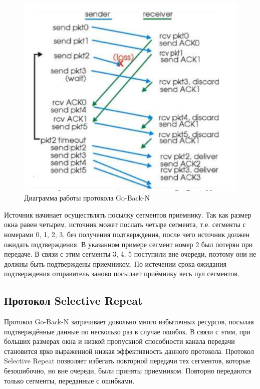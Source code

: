 \begin{figure}[H]
	\begin{center}
		\includegraphics[scale=0.6]{im2}
		\caption{Диаграмма работы протокола Go-Back-N}
	\end{center}
\end{figure}

Источник начинает осуществлять посылку сегментов приемнику. Так как размер окна равен четырем, источник может послать четыре
сегмента, т.е. сегменты с номерами 0, 1, 2, 3, без получения подтверждения, после чего источник должен ожидать подтверждения. В указанном примере сегмент номер 2 был потерян при передаче. В связи
с этим сегменты 3, 4, 5 поступили вне очереди, поэтому они не должны быть подтверждены приемником.
По истечении срока ожидания подтверждения отправитель заново посылает приёмнику весь пул сегментов.

\subsection{Протокол Selective Repeat}

Протокол Go-Back-N затрачивает довольно много избыточных ресурсов, посылая подтверждённые данные по несколько раз в случае ошибок. В связи с этим, при больших размерах окна и низкой пропускной способности канала передачи становится ярко выраженной низкая эффективность данного протокола. Протокол Selective Repeat позволяет
избегать повторной передачи тех сегментов, которые безошибочно, но вне
очереди, были приняты приемником. Повторно передаются только сегменты,
переданные с ошибками.

